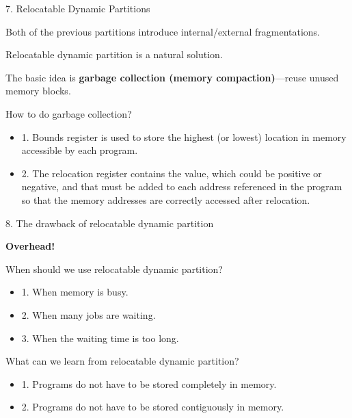 \begin{slide}{ 7. Relocatable Dynamic Partitions}
\item Both of the previous partitions introduce internal/external fragmentations.
\item Relocatable dynamic partition is a natural solution.
\item The basic idea is {\bf garbage collection (memory compaction)}---reuse unused memory blocks.
\item How to do garbage collection?
 \begin{itemize}
 \item 1. Bounds register is used to store the highest (or lowest) location in
 memory accessible by each program.
 \item 2. The relocation register contains the value, which could be positive
 or negative, and that must be added to each address referenced in the program
 so that the memory addresses are correctly accessed after relocation.
 \end{itemize}
\end{slide}

\begin{slide}{ 8. The drawback of relocatable dynamic partition}
\item {\bf Overhead!}
\item When should we use relocatable dynamic partition?
 \begin{itemize}
 \item 1. When memory is busy.
 \item 2. When many jobs are waiting.
 \item 3. When the waiting time is too long.
 \end{itemize}
\item What can we learn from relocatable dynamic partition?
 \begin{itemize}
 \item 1. Programs do not have to be stored completely in memory.
 \item 2. Programs do not have to be stored contiguously in memory.
 \end{itemize}
\end{slide}





